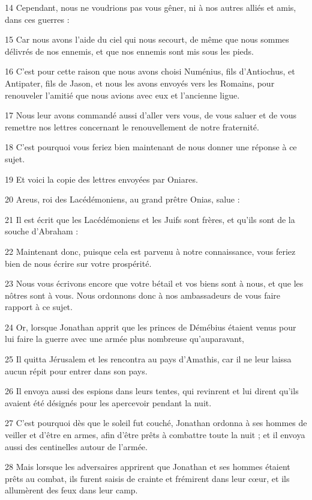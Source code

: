 \par 14 Cependant, nous ne voudrions pas vous gêner, ni à nos autres alliés et amis, dans ces guerres :
\par 15 Car nous avons l'aide du ciel qui nous secourt, de même que nous sommes délivrés de nos ennemis, et que nos ennemis sont mis sous les pieds.
\par 16 C'est pour cette raison que nous avons choisi Numénius, fils d'Antiochus, et Antipater, fils de Jason, et nous les avons envoyés vers les Romains, pour renouveler l'amitié que nous avions avec eux et l'ancienne ligue.
\par 17 Nous leur avons commandé aussi d'aller vers vous, de vous saluer et de vous remettre nos lettres concernant le renouvellement de notre fraternité.
\par 18 C'est pourquoi vous feriez bien maintenant de nous donner une réponse à ce sujet.
\par 19 Et voici la copie des lettres envoyées par Oniares.
\par 20 Areus, roi des Lacédémoniens, au grand prêtre Onias, salue :
\par 21 Il est écrit que les Lacédémoniens et les Juifs sont frères, et qu'ils sont de la souche d'Abraham :
\par 22 Maintenant donc, puisque cela est parvenu à notre connaissance, vous feriez bien de nous écrire sur votre prospérité.
\par 23 Nous vous écrivons encore que votre bétail et vos biens sont à nous, et que les nôtres sont à vous. Nous ordonnons donc à nos ambassadeurs de vous faire rapport à ce sujet.
\par 24 Or, lorsque Jonathan apprit que les princes de Démébius étaient venus pour lui faire la guerre avec une armée plus nombreuse qu'auparavant,
\par 25 Il quitta Jérusalem et les rencontra au pays d'Amathis, car il ne leur laissa aucun répit pour entrer dans son pays.
\par 26 Il envoya aussi des espions dans leurs tentes, qui revinrent et lui dirent qu'ils avaient été désignés pour les apercevoir pendant la nuit.
\par 27 C'est pourquoi dès que le soleil fut couché, Jonathan ordonna à ses hommes de veiller et d'être en armes, afin d'être prêts à combattre toute la nuit ; et il envoya aussi des centinelles autour de l'armée.
\par 28 Mais lorsque les adversaires apprirent que Jonathan et ses hommes étaient prêts au combat, ils furent saisis de crainte et frémirent dans leur cœur, et ils allumèrent des feux dans leur camp.
